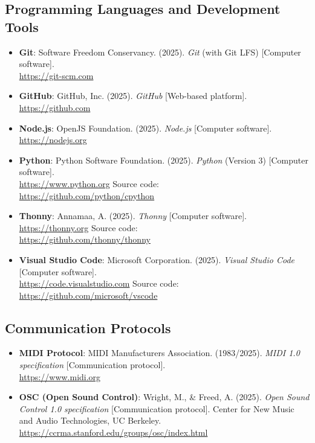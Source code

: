 \subsection*{Programming Languages and Development Tools}

\begin{itemize}[nosep]
	\item \textbf{Git}:  
	Software Freedom Conservancy. (2025). \textit{Git} (with Git LFS) [Computer software]. 
	\\ \url{https://git-scm.com}
	
	\item \textbf{GitHub}:  
	GitHub, Inc. (2025). \textit{GitHub} [Web-based platform]. 
	\\ \url{https://github.com}
	
	\item \textbf{Node.js}:  
	OpenJS Foundation. (2025). \textit{Node.js} [Computer software]. 
	\\ \url{https://nodejs.org}
	
	\item \textbf{Python}:  
	Python Software Foundation. (2025). \textit{Python} (Version 3) [Computer software]. 
	\\ \url{https://www.python.org} 
	Source code: \\ \url{https://github.com/python/cpython}
	
	\item \textbf{Thonny}:  
	Annamaa, A. (2025). \textit{Thonny} [Computer software]. 
	\\ \url{https://thonny.org} 
	Source code: \\ \url{https://github.com/thonny/thonny}
	
	\item \textbf{Visual Studio Code}:  
	Microsoft Corporation. (2025). \textit{Visual Studio Code} [Computer software]. 
	\\ \url{https://code.visualstudio.com} 
	Source code: \\ \url{https://github.com/microsoft/vscode}
\end{itemize}

\subsection*{Communication Protocols}

\begin{itemize}[nosep]
	\item \textbf{MIDI Protocol}:  
	MIDI Manufacturers Association. (1983/2025). \textit{MIDI 1.0 specification} [Communication protocol]. 
	\\ \url{https://www.midi.org}
	
	\item \textbf{OSC (Open Sound Control)}:  
	Wright, M., \& Freed, A. (2025). \textit{Open Sound Control 1.0 specification} [Communication protocol]. 
	Center for New Music and Audio Technologies, UC Berkeley.
	\\ \url{https://ccrma.stanford.edu/groups/osc/index.html}
\end{itemize}

